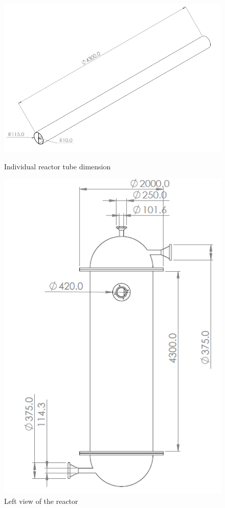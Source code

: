 \begin{figure}[h]
    \begin{minipage}[t]{0.49\linewidth}
    \includegraphics[width=0.5\linewidth]{chapters/2-reaction/figures/FYD solo tube with calc.PNG}
    \caption{Individual reactor tube dimension}
    \label{fig:soloreactorrube}
    \end{minipage}\hfill
    \begin{minipage}[t]{0.49\linewidth}
        \includegraphics[width=\linewidth]{chapters/2-reaction/figures/FYD reactor left view with calc.PNG}
        \caption{Left view of the reactor}
        \label{fig:reactorleft}
    \end{minipage}
\end{figure}